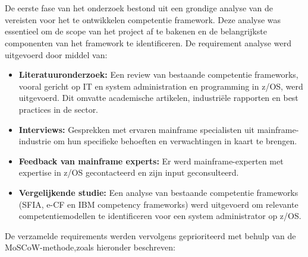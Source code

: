 \section{}%
\label{sec:requirement-analyse}
De eerste fase van het onderzoek bestond uit een grondige analyse van de vereisten voor het te ontwikkelen competentie framework. Deze analyse was essentieel om de scope van het project af te bakenen en de belangrijkste componenten van het framework te identificeren. De requirement analyse werd uitgevoerd door middel van:
\begin{itemize}
    \item \textbf{Literatuuronderzoek:} Een review van bestaande competentie frameworks, vooral gericht op IT en system administration en programming in z/OS, werd uitgevoerd. Dit omvatte academische artikelen, industriële rapporten en best practices in de sector.
    \item \textbf{Interviews:} Gesprekken met ervaren mainframe specialisten uit mainframe-industrie om hun specifieke behoeften en verwachtingen in kaart te brengen.
    \item \textbf{Feedback van mainframe experts:} Er werd mainframe-experten met expertise in z/OS gecontacteerd en zijn input geconsulteerd.
    \item \textbf{Vergelijkende studie:} Een analyse van bestaande competentie frameworks (SFIA, e-CF en IBM competency frameworks) werd uitgevoerd om relevante competentiemodellen te identificeren voor een system administrator op z/OS.
\end{itemize}
De verzamelde requirements werden vervolgens geprioriteerd met behulp van de MoSCoW-methode,zoals hieronder beschreven:
\section{}%
\label{sec:moscow-methode}
